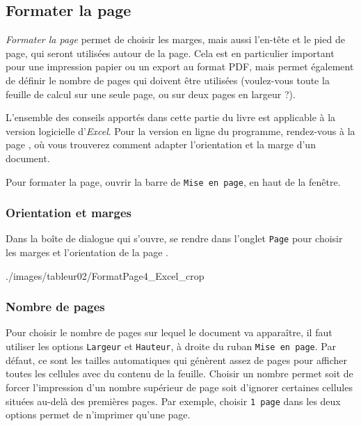 


\subsection{Formater la page}\label{Calc2FormaterPage} 

\emph{Formater la page} permet de choisir les marges, mais aussi l'en-tête et le pied de page, qui seront utilisées autour de la page. Cela est en particulier important pour une impression papier ou un export au format PDF, mais permet également de définir le nombre de pages qui doivent être utilisées (voulez-vous toute la feuille de calcul sur une seule page, ou sur deux pages en largeur ?).

L'ensemble des conseils apportés dans cette partie du livre est applicable à la version logicielle d'\emph{Excel}. Pour la version en ligne du programme, rendez-vous à la page \pageref{Calc2FormaterPageOffice}, où vous trouverez comment adapter l'orientation et la marge d'un document.

\vspace{12pt}

Pour formater la page, ouvrir la barre de \texttt{Mise en page}, en haut de la fenêtre. 




\subsubsection{Orientation et marges}  

Dans la boîte de dialogue qui s'ouvre, se rendre dans l'onglet \texttt{Page} pour choisir les marges  et l'orientation de la page .

%
                {./images/tableur02/FormatPage4_Excel_crop}{\textwidth}  


\subsubsection{Nombre de pages}

Pour choisir le nombre de pages sur lequel le document va apparaître, il faut utiliser les options \texttt{Largeur} et \texttt{Hauteur}, à droite du ruban \texttt{Mise en page}. Par défaut, ce sont les tailles automatiques qui génèrent assez de pages pour afficher toutes les cellules avec du contenu de la feuille. Choisir un nombre permet soit de forcer l'impression d'un nombre supérieur de page soit d'ignorer certaines cellules situées au-delà des premières pages. Par exemple, choisir \texttt{1 page} dans les deux options permet de n'imprimer qu'une page.

